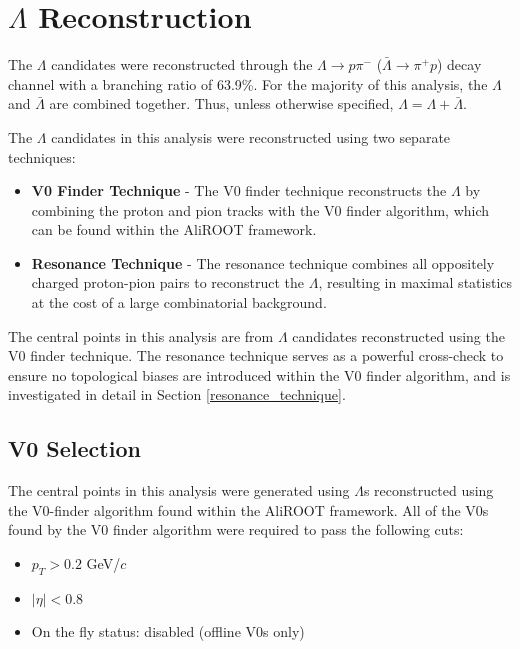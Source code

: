 \documentclass[ALICE,manyauthors]{ALICE_analysis_notes}
\begin{document}
\section{$\Lambda$ Reconstruction}
\label{lambda_reconstruction}

The $\Lambda$ candidates were reconstructed through the $\Lambda \rightarrow p\pi^{-}$ ($\bar{\Lambda} \rightarrow \pi^{+}p$) decay channel with a branching ratio of 63.9\%. For the majority of this analysis, the $\Lambda$ and $\bar{\Lambda}$ are combined together. Thus, unless otherwise specified, $\Lambda = \Lambda + \bar{\Lambda}$. 

The $\Lambda$ candidates in this analysis were reconstructed using two separate techniques:
\begin{itemize}
	\item \textbf{V0 Finder Technique} - The V0 finder technique reconstructs the $\Lambda$ by combining the proton and pion tracks with the V0 finder algorithm, which can be found within the AliROOT framework.
	\item \textbf{Resonance Technique} - The resonance technique combines all oppositely charged proton-pion pairs to reconstruct the $\Lambda$, resulting in maximal statistics at the cost of a large combinatorial background.
\end{itemize}

The central points in this analysis are from $\Lambda$ candidates reconstructed using the V0 finder technique. The resonance technique serves as a powerful cross-check to ensure no topological biases are introduced within the V0 finder algorithm, and is investigated in detail in Section \ref{resonance_technique}.

\subsection{V0 Selection}
\label{v0_selection}
The central points in this analysis were generated using $\Lambda$s reconstructed using the V0-finder algorithm found within the AliROOT framework. All of the V0s found by the V0 finder algorithm were required to pass the following cuts:

\begin{itemize}
	\item $p_{T} > 0.2$ GeV/$c$
	\item $|\eta| < 0.8$
	\item On the fly status: disabled (offline V0s only)
\end{itemize}
\end{document}
